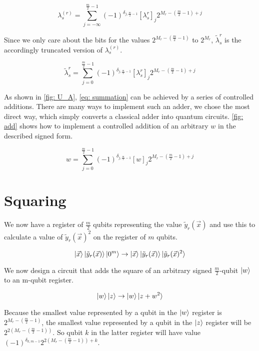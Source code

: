 \begin{equation}
    \lambda^{(r)}_s = \sum_{j = -\infty}^{\frac{m}{2} - 1} (-1)^{\delta_{j, \frac{m}{2} - 1}}[\lambda^r_s]_j2^{M_r - (\frac{m}{2} - 1) + j}
\end{equation}

Since we only care about the bits for the values $2^{M_r - (\frac{m}{2} - 1)}$ to $2^{M_r}$, $\tilde{\lambda}^r_s$ is the accordingly truncated version of $\lambda^{(r)}_s$.

\begin{equation}
    \tilde{\lambda}^r_s = \sum_{j = 0}^{\frac{m}{2} - 1} (-1)^{\delta_{j, \frac{m}{2} - 1}}[\lambda^r_s]_j2^{M_r - (\frac{m}{2} - 1) + j}
\end{equation}

As shown in \ref{fig: U_A}, \eqref{eq: summation} can be achieved by a series of controlled additions. There are many ways to implement such an adder, we chose the most direct way, which simply converts a classical adder into quantum circuits. \ref{fig: add} shows how to implement a controlled addition of an arbitrary $w$ in the described signed form.

\begin{equation}
    w = \sum_{j = 0}^{\frac{m}{2} - 1} (-1)^{\delta_{j, \frac{m}{2} - 1}}[w]_j2^{M_r - (\frac{m}{2} - 1) + j}
\end{equation}

\section{Squaring}

We now have a register of $\frac{m}{2}$ qubits representing the value $\tilde{y}_r(\vec{x})$ and use this to calculate a value of $\tilde{y}_r(\vec{x})^2$ on the register of $m$ qubits.

\begin{equation}
    \ket{\vec{x}}\ket{\tilde{y}_r(\vec{x})}\ket{0^m} \rightarrow \ket{\vec{x}}\ket{\tilde{y}_r(\vec{x})}\ket{\tilde{y}_r(\vec{x})^2} \label{eq: y^2}
\end{equation}

We now design a circuit that adds the square of an arbitrary signed $\frac{m}{2}$-qubit $\ket{w}$ to an m-qubit register.

\begin{equation}
    \ket{w}\ket{z} \rightarrow \ket{w}\ket{z + w^2}
\end{equation}

Because the smallest value represented by a qubit in the $\ket{w}$ register is $2^{M_r - (\frac{m}{2} - 1)}$, the smallest value represented by a qubit in the $\ket{z}$ register will be $2^{2(M_r - (\frac{m}{2} - 1))}$. So qubit $k$ in the latter register will have value $(-1)^{\delta_{k, m - 1}}2^{2(M_r - (\frac{m}{2} - 1)) + k}$.


